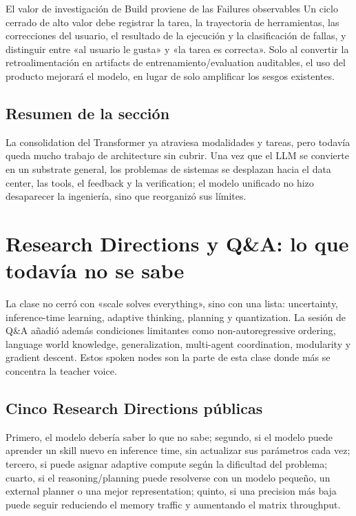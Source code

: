 \documentclass[a4paper]{article}
\begin{document}
\begin{importantbox}{El valor de investigación de Build proviene de las Failures observables}
Un ciclo cerrado de alto valor debe registrar la tarea, la trayectoria de herramientas, las correcciones del usuario, el resultado de la ejecución y la clasificación de fallas, y distinguir entre «al usuario le gusta» y «la tarea es correcta». Solo al convertir la retroalimentación en artifacts de entrenamiento/evaluation auditables, el uso del producto mejorará el modelo, en lugar de solo amplificar los sesgos existentes.
\end{importantbox}

\subsection{Resumen de la sección}

La consolidation del Transformer ya atraviesa modalidades y tareas, pero todavía queda mucho trabajo de architecture sin cubrir. Una vez que el LLM se convierte en un substrate general, los problemas de sistemas se desplazan hacia el data center, las tools, el feedback y la verification; el modelo unificado no hizo desaparecer la ingeniería, sino que reorganizó sus límites.
\section{Research Directions y Q\&A: lo que todavía no se sabe}

La clase no cerró con «scale solves everything», sino con una lista: uncertainty, inference-time learning, adaptive thinking, planning y quantization. La sesión de Q\&A añadió además condiciones limitantes como non-autoregressive ordering, language world knowledge, generalization, multi-agent coordination, modularity y gradient descent. Estos spoken nodes son la parte de esta clase donde más se concentra la teacher voice.

\subsection{Cinco Research Directions públicas}

Primero, el modelo debería saber lo que no sabe; segundo, si el modelo puede aprender un skill nuevo en inference time, sin actualizar sus parámetros cada vez; tercero, si puede asignar adaptive compute según la dificultad del problema; cuarto, si el reasoning/planning puede resolverse con un modelo pequeño, un external planner o una mejor representation; quinto, si una precision más baja puede seguir reduciendo el memory traffic y aumentando el matrix throughput.
\end{document}
